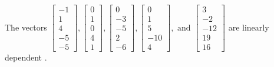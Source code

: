 \begin{exercise}
\begin{exerciseStatement}
  \end{exerciseStatement}
  \begin{exerciseAnswer}
   The vectors \(\left[\begin{array}{r}
-1 \\
1 \\
4 \\
-5 \\
-5
\end{array}\right] , \left[\begin{array}{r}
0 \\
1 \\
0 \\
4 \\
1
\end{array}\right] , \left[\begin{array}{r}
0 \\
-3 \\
-5 \\
2 \\
-6
\end{array}\right] , \left[\begin{array}{r}
0 \\
1 \\
5 \\
-10 \\
4
\end{array}\right] , \text{ and } \left[\begin{array}{r}
3 \\
-2 \\
-12 \\
19 \\
16
\end{array}\right]\) are 
  	 linearly dependent  .
  


  \end{exerciseAnswer}
\end{exercise}
